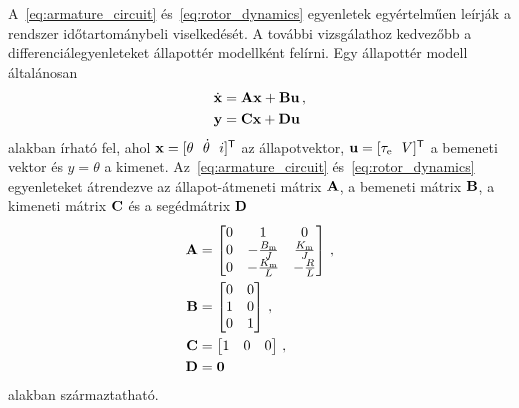 A~\eqref{eq:armature_circuit} és~\eqref{eq:rotor_dynamics} egyenletek egyértelműen leírják a 
rendszer időtartománybeli viselkedését.
A további vizsgálathoz kedvezőbb a differenciálegyenleteket állapottér modellként felírni.
Egy állapottér modell általánosan
\begin{equation}\label{eq:state_space_generic}
\begin{split}
    \dot{\mathbf{x}} &= \mathbf{A} \mathbf{x} + \mathbf{B} \mathbf{u}\,,\\
    \mathbf{y} &= \mathbf{C} \mathbf{x} + \mathbf{D} \mathbf{u}
\end{split}
\end{equation} 
alakban írható fel, ahol \(\mathbf{x} = [\theta~~\dot \theta~~i]^{\mathsf T}\) az állapotvektor, 
\(\mathbf{u} = [\tau_{\mathrm{e}}~~V]^{\mathsf T}\) a bemeneti vektor és \(y = \theta\) a kimenet.
Az~\eqref{eq:armature_circuit} és~\eqref{eq:rotor_dynamics} egyenleteket átrendezve 
az állapot-átmeneti mátrix \(\mathbf{A}\), a bemeneti mátrix \(\mathbf{B}\), a kimeneti mátrix \(\mathbf{C}\) és a segédmátrix \(\mathbf{D}\) 
\begin{equation}\label{eq:state_space}
    \begin{split}
        \mathbf{A} &= 
        \begin{bmatrix}
            0 & 1 & 0 \\
            0 & -\frac{B_{\mathrm{m}}}{J} & \frac{K_{\mathrm{m}}}{J} \\
            0 & -\frac{K_{\mathrm{m}}}{L} & -\frac{R}{L} \\
        \end{bmatrix}\,,\\
        \mathbf{B} &=
        \begin{bmatrix}
            0 & 0 \\
            1 & 0 \\
            0 & 1 \\
        \end{bmatrix}\,,\\
        \mathbf{C} &=
        \begin{bmatrix}
            1 & 0 & 0 \\
        \end{bmatrix}\,,\\
        \mathbf{D} &= \mathbf{0}
    \end{split}
\end{equation}
alakban származtatható.

